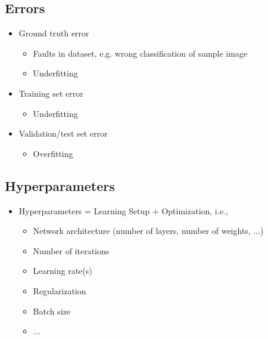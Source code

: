 \documentclass[10pt,a4paper]{article}
\begin{document}
\subsection{Errors}
\begin{itemize}
	\item Ground truth error
	\begin{itemize}
		\item Faults in dataset, e.g. wrong classification of sample image
		\item Underfitting
	\end{itemize}
	\item Training set error
	\begin{itemize}
		\item Underfitting
	\end{itemize}
	\item Validation/test set error
	\begin{itemize}
		\item Overfitting
	\end{itemize}
\end{itemize}

\subsection{Hyperparameters}
\begin{itemize}
	\item Hyperparameters = Learning Setup + Optimization, i.e.,
	\begin{itemize}
		\item Network architecture (number of layers, number of weights, ...)
		\item Number of iterations
		\item Learning rate(s)
		\item Regularization
		\item Batch size
		\item ...
	\end{itemize}
\end{itemize}
\end{document}
